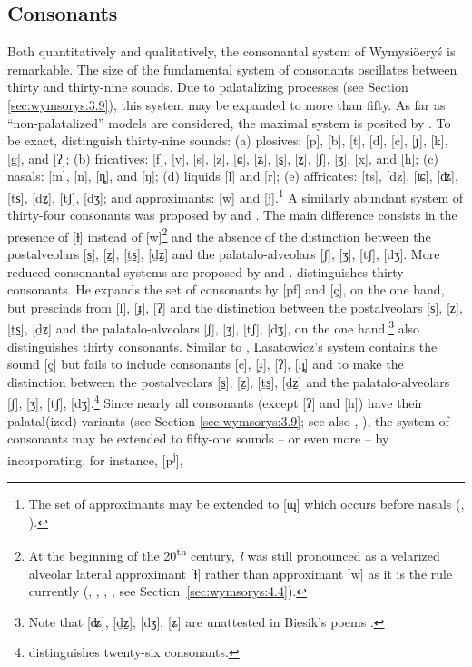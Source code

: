\documentclass[output=paper,hidelinks]{langscibook}
\begin{document}
\subsection{Consonants}\label{sec:wymsorys:3.7}

Both quantitatively and qualitatively, the consonantal system of Wymysiöeryś is remarkable. The size of the fundamental system of consonants oscillates between thirty and thirty-nine sounds. Due to palatalizing processes (see Section \ref{sec:wymsorys:3.9}), this system may be expanded to more than fifty. As far as ``non-palatalized'' models are considered, the maximal system is posited by \citet[17--18]{andrason_grammar_2016}. To be exact, \citet{andrason_grammar_2016} distinguish thirty-nine sounds: (a) plosives: [p], [b], [t], [d], [c], [ɟ], [k], [g], and [ʔ]; (b) fricatives: [f], [v], [s], [z], [ɕ], [ʑ], [s̠], [z̠], [ʃ], [ʒ], [x], and [h]; (c) nasals: [m], [n], [ȵ], and [ŋ]; (d) liquids [l] and [r]; (e) affricates: [ts], [dz], [ʨ], [ʥ], [ṯs̠], [ḏz̠], [tʃ], [dʒ]; and approximants: [w] and [j].\footnote{The set of approximants may be extended to [ɰ] which occurs before nasals (\citealt[17--18]{andrason_grammar_2016}, \citealt{Andrason2021}).} A similarly abundant system of thirty-four consonants was proposed by \citet[13--14]{kleczkowski_dialekt_1920} and \citet[xiv--xv]{mojmir_worterbuch}. The main difference consists in the presence of [ɫ] instead of [w]\footnote{At the beginning of the 20\textsuperscript{th} century, \textit{ł} was still pronounced as a velarized alveolar lateral approximant [ɫ] rather than approximant [w] as it is the rule currently (\citealt[13, 121--126]{kleczkowski_dialekt_1920}, \citealt[xiv]{mojmir_worterbuch}, \citealt[406]{wicherkiewicz_making_2003}, \citealt{zak2019pewnym}, see Section~\ref{sec:wymsorys:4.4}).} and the absence of the distinction between the postalveolars [s̠], [z̠], [ṯs̠], [ḏz̠] and the palatalo-alveolars [ʃ], [ʒ], [tʃ], [dʒ]. More reduced consonantal systems are proposed by \citet{wicherkiewicz_making_2003} and \citet{lasatowicz_deutsche_1994}. \citet[406--409]{wicherkiewicz_making_2003} distinguishes thirty consonants. He expands the set of consonants by [pf] and [ç], on the one hand, but prescinds from [l], [ɟ], [ʔ] and the distinction between the postalveolars [s̠], [z̠], [ṯs̠], [ḏz̠] and the palatalo-alveolars [ʃ], [ʒ], [tʃ], [dʒ], on the one hand.\footnote{Note that [ʥ], [ḏz̠], [dʒ], [ʑ] are unattested in Biesik's poems \citep[408--409]{wicherkiewicz_making_2003}.} \citet[36, 42, 52]{lasatowicz_deutsche_1994} also distinguishes thirty consonants. Similar to \citet{wicherkiewicz_making_2003}, Lasatowicz's system contains the sound [ç] but fails to include consonants [c], [ɟ], [ʔ], [ȵ] and to make the distinction between the postalveolars [s̠], [z̠], [ṯs̠], [ḏz̠] and the palatalo-alveolars [ʃ], [ʒ], [tʃ], [dʒ].\footnote{\citet[270]{latosinski_monografia_1909} distinguishes twenty-six consonants.} Since nearly all consonants (except [ʔ] and [h]) have their palatal(ized) variants (see Section \ref{sec:wymsorys:3.9}; see also \citealt[15]{kleczkowski_dialekt_1920}, \citealt{mojmir_worterbuch, andrason_grammar_2016}), the system of consonants may be extended to fifty-one sounds – or even more – by incorporating, for instance, [p\textsuperscript{j}], 
\end{document}
